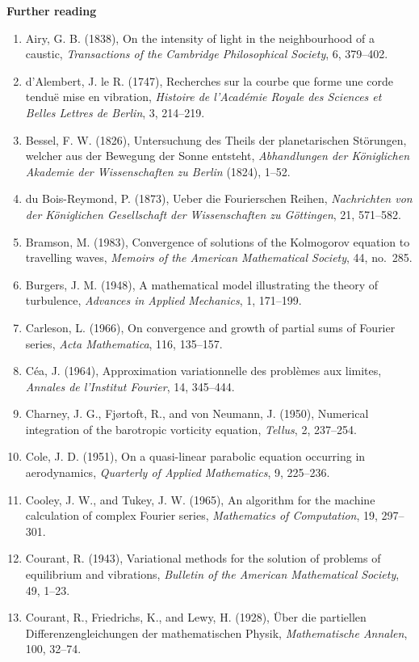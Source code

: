 \documentclass[11pt,a4paper]{article}
\numberwithin{equation}{section}
\theoremstyle{definition}
\newcommand{\subhead}[1]{%
  \par\medskip\noindent\textbf{#1}\par\nobreak\smallskip}
\begin{document}
\subhead{Further reading}
\begin{enumerate}
\item Airy, G. B. (1838), On the intensity of light in the neighbourhood of a caustic, \emph{Transactions of the Cambridge Philosophical Society}, 6, 379--402.
\item d'Alembert, J. le R. (1747), Recherches sur la courbe que forme une corde tendu\"e mise en vibration, \emph{Histoire de l'Acad\'emie Royale des Sciences et Belles Lettres de Berlin}, 3, 214--219.
\item Bessel, F. W. (1826), Untersuchung des Theils der planetarischen St\"orungen, welcher aus der Bewegung der Sonne entsteht, \emph{Abhandlungen der K\"oniglichen Akademie der Wissenschaften zu Berlin} (1824), 1--52.
\item du Bois-Reymond, P. (1873), Ueber die Fourierschen Reihen, \emph{Nachrichten von der K\"oniglichen Gesellschaft der Wissenschaften zu G\"ottingen}, 21, 571--582.
\item Bramson, M. (1983), Convergence of solutions of the Kolmogorov equation to travelling waves, \emph{Memoirs of the American Mathematical Society}, 44, no.~285.
\item Burgers, J. M. (1948), A mathematical model illustrating the theory of turbulence, \emph{Advances in Applied Mechanics}, 1, 171--199.
\item Carleson, L. (1966), On convergence and growth of partial sums of Fourier series, \emph{Acta Mathematica}, 116, 135--157.
\item C\'ea, J. (1964), Approximation variationnelle des probl\`emes aux limites, \emph{Annales de l'Institut Fourier}, 14, 345--444.
\item Charney, J. G., Fj\o rtoft, R., and von Neumann, J. (1950), Numerical integration of the barotropic vorticity equation, \emph{Tellus}, 2, 237--254.
\item Cole, J. D. (1951), On a quasi-linear parabolic equation occurring in aerodynamics, \emph{Quarterly of Applied Mathematics}, 9, 225--236.
\item Cooley, J. W., and Tukey, J. W. (1965), An algorithm for the machine calculation of complex Fourier series, \emph{Mathematics of Computation}, 19, 297--301.
\item Courant, R. (1943), Variational methods for the solution of problems of equilibrium and vibrations, \emph{Bulletin of the American Mathematical Society}, 49, 1--23.
\item Courant, R., Friedrichs, K., and Lewy, H. (1928), \"Uber die partiellen Differenzengleichungen der mathematischen Physik, \emph{Mathematische Annalen}, 100, 32--74.

\end{enumerate}
\end{document}
